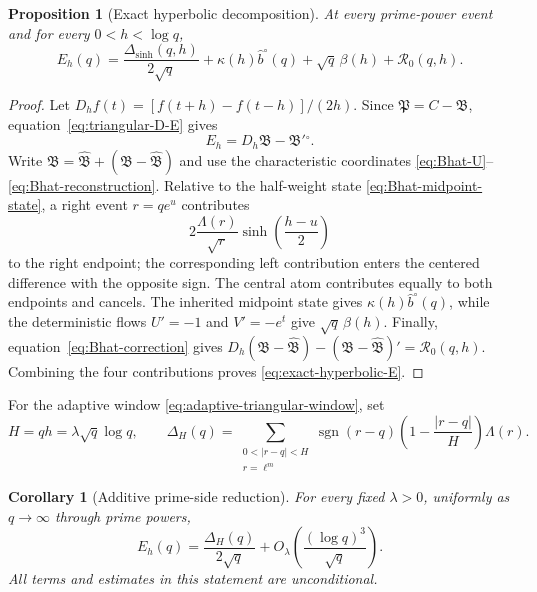\documentclass[11pt,a4paper]{article}
\numberwithin{equation}{section}
\newtheorem{proposition}[theorem]{Proposition}
\newtheorem{corollary}[theorem]{Corollary}
\theoremstyle{definition}
\newcommand{\Bres}{\mathfrak B}
\newcommand{\Bhat}{\widehat{\mathfrak B}}
\begin{document}
\begin{proposition}[Exact hyperbolic decomposition]
\label{prop:exact-hyperbolic-E}
At every prime-power event and for every \(0<h<\log q\),
\begin{equation}\label{eq:exact-hyperbolic-E}
 \boxed{
 E_h(q)=
 \frac{\Delta_{\sinh}(q,h)}{2\sqrt q}
 +\kappa(h)\widehat b^\circ(q)
 +\sqrt q\,\beta(h)
 +\mathcal R_0(q,h).
 }
\end{equation}
\end{proposition}

\begin{proof}
Let \(D_hf(t)=[f(t+h)-f(t-h)]/(2h)\).  Since
\(\mathfrak P=C-\Bres\), equation~\eqref{eq:triangular-D-E} gives
\[
 E_h=D_h\Bres-\Bres'{}^\circ.
\]
Write \(\Bres=\Bhat+(\Bres-\Bhat)\) and use the characteristic coordinates
\eqref{eq:Bhat-U}--\eqref{eq:Bhat-reconstruction}.  Relative to the
half-weight state \eqref{eq:Bhat-midpoint-state}, a right event
\(r=qe^u\) contributes
\[
 2\frac{\Lambda(r)}{\sqrt r}
 \sinh\!\left(\frac{h-u}{2}\right)
\]
to the right endpoint; the corresponding left contribution enters the
centered difference with the opposite sign.  The central atom contributes
equally to both endpoints and cancels.  The inherited midpoint state gives
\(\kappa(h)\widehat b^\circ(q)\), while the deterministic flows
\(U'=-1\) and \(V'=-e^t\) give \(\sqrt q\,\beta(h)\).  Finally,
equation~\eqref{eq:Bhat-correction} gives
\(D_h(\Bres-\Bhat)-(\Bres-\Bhat)'=\mathcal R_0(q,h)\).
Combining the four contributions proves \eqref{eq:exact-hyperbolic-E}.
\end{proof}

For the adaptive window \eqref{eq:adaptive-triangular-window}, set
\begin{equation}\label{eq:additive-triangular-Chebyshev}
 H=qh=\lambda\sqrt q\log q,
 \qquad
 \Delta_H(q)=
 \sum_{\substack{0<|r-q|<H\\ r=\ell^m}}
 \operatorname{sgn}(r-q)
 \left(1-\frac{|r-q|}{H}\right)\Lambda(r).
\end{equation}

\begin{corollary}[Additive prime-side reduction]
\label{cor:additive-E-reduction}
For every fixed \(\lambda>0\), uniformly as \(q\to\infty\) through prime
powers,
\begin{equation}\label{eq:additive-E-reduction}
 \boxed{
 E_h(q)=\frac{\Delta_H(q)}{2\sqrt q}
 +O_\lambda\!\left(\frac{(\log q)^3}{\sqrt q}\right).
 }
\end{equation}
All terms and estimates in this statement are unconditional.
\end{corollary}
\end{document}
